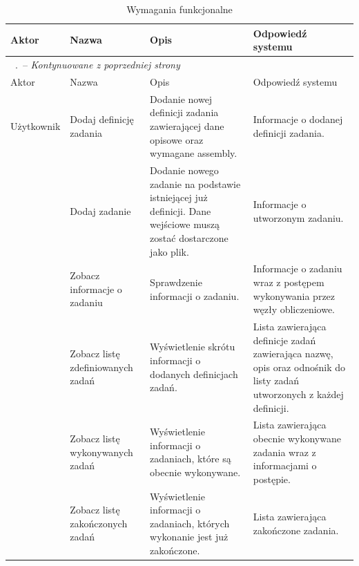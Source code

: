 \documentclass[a4paper,11pt,twoside]{report}
\renewcommand*{\thetable}{\arabic{chapter}.\arabic{table}}
\theoremstyle{definition}
\begin{document}
            \begin{longtable}{| p{} | p{} | p{} | p{} |}
                \caption{Wymagania funkcjonalne}
                \label{wymagania-funkcjonalne} \\
                \hline
                Aktor & Nazwa & Opis & Odpowiedź systemu \\ \hline
                \endfirsthead
                \multicolumn{4}{l}{\footnotesize \tablename\ \thetable\ -- \textit{Kontynuowane z poprzedniej strony}} \\
                \hline
                Aktor & Nazwa & Opis & Odpowiedź systemu \\ \hline
                \endhead
                
                Użytkownik
                & Dodaj definicję zadania
                & Dodanie nowej definicji zadania zawierającej dane opisowe oraz wymagane assembly.
                & Informacje o dodanej definicji zadania. \\ \cline{2-4} 
                
                & Dodaj zadanie
                & Dodanie nowego zadanie na podstawie istniejącej już definicji. Dane wejściowe muszą zostać dostarczone jako plik.
                & Informacje o utworzonym zadaniu. \\ \cline{2-4} 
                
                & Zobacz informacje o zadaniu
                & Sprawdzenie informacji o zadaniu.
                & Informacje o zadaniu wraz z postępem wykonywania przez węzły obliczeniowe. \\ \cline{2-4} 

                & Zobacz listę zdefiniowanych zadań
                & Wyświetlenie skrótu informacji o dodanych definicjach zadań.
                & Lista zawierająca definicje zadań zawierająca nazwę, opis oraz odnośnik do listy zadań utworzonych z każdej definicji. \\ \cline{2-4} 
                
                & Zobacz listę wykonywanych zadań   
                & Wyświetlenie informacji o zadaniach, które są obecnie wykonywane.                             
                & Lista zawierająca obecnie wykonywane zadania wraz z informacjami o postępie. \\ \cline{2-4} 
                
                & Zobacz listę zakończonych zadań  
                & Wyświetlenie informacji o zadaniach, których wykonanie jest już zakończone.
                & Lista zawierająca zakończone zadania. \\ \cline{2-4} 
                

\end{longtable}
\end{document}
